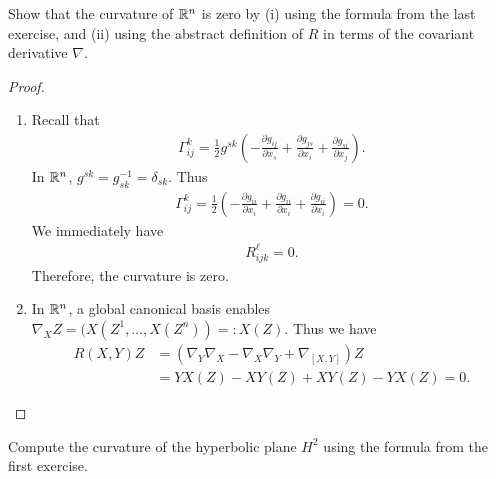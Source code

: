 \documentclass[12pt]{article}
\begin{document}
\begin{problem}[2]
Show that the curvature of $ \mathbb{R}^{n}$ is zero by (i) using the formula from the last exercise, and (ii) using the abstract definition of  $ R$ in terms of the covariant derivative  $ \nabla $.
\end{problem}
\begin{proof}
\begin{enumerate}[label=(\roman*)]
	\item 	Recall that
\begin{align*}
	\Gamma_{ i j}^{ k} = \frac{1}{2} g^{sk} \left( - \frac{\partial g_{ij}}{\partial x_s} + \frac{\partial g_{js}}{\partial x_i} + \frac{\partial g_{si}}{\partial x_j}    \right) .
\end{align*}
In $ \mathbb{R}^{n}$, $ g^{sk} = g_{sk}^{-1} = \delta_{sk}$. Thus
\begin{align*}
	\Gamma_{ i j}^{ k} = \frac{1}{2} \left( - \frac{\partial g_{ii}}{\partial x_i} + \frac{\partial g_{ii}}{\partial x_i} + \frac{\partial g_{ii}}{\partial x_i}    \right) = 0 . 
\end{align*}
We immediately have
\begin{align*}
	R_{ijk}^{\ell} = 0 .
\end{align*}
Therefore, the curvature is zero.
\item In $ \mathbb{R}^{n}$, a global canonical basis enables $ \nabla_X Z = (X(Z^{1},\ldots,X(Z^{n})) =: X(Z)$. Thus we have
\begin{align*}
	R(X,Y)Z&=(\nabla_Y \nabla_X - \nabla _X \nabla _Y  + \nabla _{[X,Y]})Z \\
	&= YX(Z) - XY(Z) + XY(Z) - YX(Z) = 0  . 
\end{align*}
\end{enumerate}
\end{proof}
\begin{problem}[3]
Compute the curvature of the hyperbolic plane $ H^2$ using the formula from the first exercise.
\end{problem}
\end{document}

